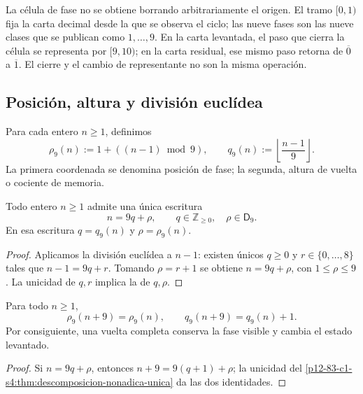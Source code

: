 La célula de fase no se obtiene borrando arbitrariamente el origen. El tramo
\([0,1)\) fija la carta decimal desde la que se observa el ciclo; las nueve
fases son las nueve clases que se publican como \(1,\ldots,9\). En la carta
levantada, el paso que cierra la célula se representa por \([9,10)\); en la
carta residual, ese mismo paso retorna de \(\overline0\) a \(\overline1\).
El cierre y el cambio de representante no son la misma operación.

\subsection{Posición, altura y división euclídea}

\begin{definition}
Para cada entero \(n\geq1\), definimos
\[
 \rho_9(n):=1+((n-1)\bmod9),
 \qquad
 q_9(n):=\left\lfloor\frac{n-1}{9}\right\rfloor.
\]
La primera coordenada se denomina posición de fase; la segunda, altura de
vuelta o cociente de memoria.
\end{definition}

\begin{theorem}
\label{p12-83-c1-s4:thm:descomposicion-nonadica-unica}
Todo entero \(n\geq1\) admite una única escritura
\[
 n=9q+\rho,
 \qquad q\in\mathbb Z_{\geq0},\quad \rho\in\mathsf D_9.
\]
En esa escritura \(q=q_9(n)\) y \(\rho=\rho_9(n)\).
\end{theorem}

\begin{proof}
Aplicamos la división euclídea a \(n-1\): existen únicos
\(q\geq0\) y \(r\in\{0,\ldots,8\}\) tales que
\(n-1=9q+r\). Tomando \(\rho=r+1\) se obtiene
\(n=9q+\rho\), con \(1\leq\rho\leq9\). La unicidad de \(q,r\) implica la
de \(q,\rho\).
\end{proof}

\begin{corollary}
\label{p12-83-c1-s4:cor:retorno-fase-incremento-memoria}
Para todo \(n\geq1\),
\[
 \rho_9(n+9)=\rho_9(n),
 \qquad
 q_9(n+9)=q_9(n)+1.
\]
Por consiguiente, una vuelta completa conserva la fase visible y cambia el
estado levantado.
\end{corollary}

\begin{proof}
Si \(n=9q+\rho\), entonces \(n+9=9(q+1)+\rho\); la unicidad del
\cref{p12-83-c1-s4:thm:descomposicion-nonadica-unica} da las dos identidades.
\end{proof}

